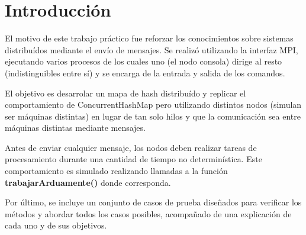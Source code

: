 \section{Introducción}

El motivo de este trabajo práctico fue reforzar los conocimientos sobre
sistemas distribuídos mediante el envío de mensajes. Se realizó utilizando la
interfaz MPI, ejecutando varios procesos de los cuales uno (el nodo consola)
dirige al resto (indistinguibles entre sí) y se encarga de la entrada y salida
de los comandos.

El objetivo es desarrolar un mapa de hash distribuído y replicar el comportamiento
de ConcurrentHashMap pero utilizando distintos nodos (simulan ser máquinas
distintas) en lugar de tan solo hilos y que la comunicación sea entre máquinas
distintas mediante mensajes.

Antes de enviar cualquier mensaje, los nodos deben realizar tareas de
procesamiento durante una cantidad de tiempo no determinística. Este
comportamiento es simulado realizando llamadas a la función
\textbf{trabajarArduamente()} donde corresponda.

Por último, se incluye un conjunto de casos de prueba diseñados para verificar
los métodos y abordar todos los casos posibles, acompañado de una explicación
de cada uno y de sus objetivos.